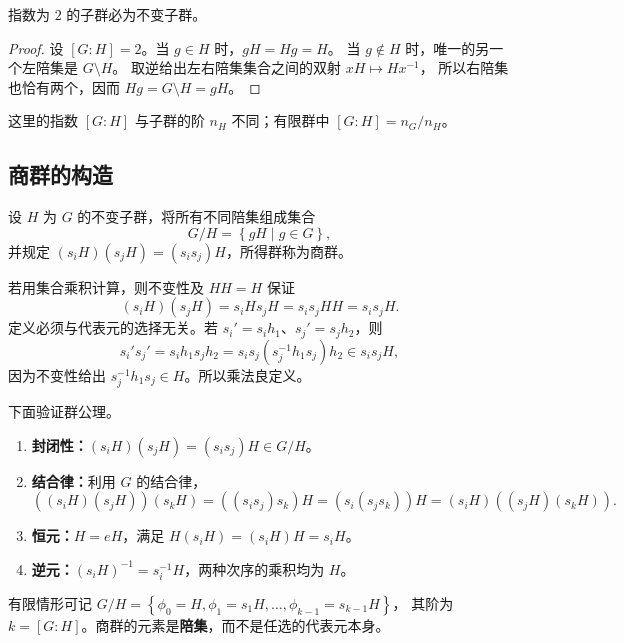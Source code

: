 \begin{proposition}
指数为 $2$ 的子群必为不变子群。
\end{proposition}
\begin{proof}
设 $\left[G:H\right]=2$。当 $g\in H$ 时，$gH=Hg=H$。
当 $g\notin H$ 时，唯一的另一个左陪集是 $G\setminus H$。
取逆给出左右陪集集合之间的双射 $xH\mapsto Hx^{-1}$，
所以右陪集也恰有两个，因而 $Hg=G\setminus H=gH$。
\end{proof}
这里的指数 $\left[G:H\right]$ 与子群的阶 $n_H$ 不同；有限群中 $\left[G:H\right]=n_G/n_H$。

\subsection{商群的构造}
\begin{definition}[商群]
设 $H$ 为 $G$ 的不变子群，将所有不同陪集组成集合
\begin{equation}
G/H=\left\{gH\mid g\in G\right\},
\end{equation}
并规定 $\left(s_iH\right)\left(s_jH\right)=\left(s_is_j\right)H$，所得群称为商群。
\end{definition}
若用集合乘积计算，则不变性及 $HH=H$ 保证
\begin{equation}
\left(s_iH\right)\left(s_jH\right)=s_iHs_jH=s_is_jHH=s_is_jH.
\end{equation}
定义必须与代表元的选择无关。若 $s_i'=s_ih_1$、$s_j'=s_jh_2$，则
\begin{equation}
s_i's_j'=s_ih_1s_jh_2
=s_is_j\left(s_j^{-1}h_1s_j\right)h_2\in s_is_jH,
\end{equation}
因为不变性给出 $s_j^{-1}h_1s_j\in H$。所以乘法良定义。

下面验证群公理。
\begin{enumerate}
\item \textbf{封闭性：}$\left(s_iH\right)\left(s_jH\right)=\left(s_is_j\right)H\in G/H$。
\item \textbf{结合律：}利用 $G$ 的结合律，
\begin{equation}
\left(\left(s_iH\right)\left(s_jH\right)\right)\left(s_kH\right)=\left(\left(s_is_j\right)s_k\right)H
=\left(s_i\left(s_js_k\right)\right)H=\left(s_iH\right)\left(\left(s_jH\right)\left(s_kH\right)\right).
\end{equation}
\item \textbf{恒元：}$H=eH$，满足 $H\left(s_iH\right)=\left(s_iH\right)H=s_iH$。
\item \textbf{逆元：}$\left(s_iH\right)^{-1}=s_i^{-1}H$，两种次序的乘积均为 $H$。
\end{enumerate}
有限情形可记 $G/H=\left\{\phi_0=H,\phi_1=s_1H,\ldots,\phi_{k-1}=s_{k-1}H\right\}$，
其阶为 $k=\left[G:H\right]$。商群的元素是\textbf{陪集}，而不是任选的代表元本身。

